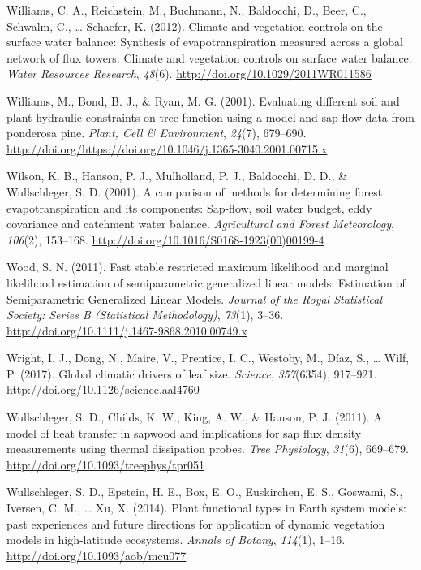 \documentclass[11pt,twoside]{reedthesis}
\begin{document}
\hypertarget{ref-williams_climate_2012}{}
Williams, C. A., Reichstein, M., Buchmann, N., Baldocchi, D., Beer, C.,
Schwalm, C., \ldots{} Schaefer, K. (2012). Climate and vegetation
controls on the surface water balance: Synthesis of evapotranspiration
measured across a global network of flux towers: Climate and vegetation
controls on surface water balance. \emph{Water Resources Research},
\emph{48}(6). \url{http://doi.org/10.1029/2011WR011586}

\hypertarget{ref-Williams2001}{}
Williams, M., Bond, B. J., \& Ryan, M. G. (2001). Evaluating different
soil and plant hydraulic constraints on tree function using a model and
sap flow data from ponderosa pine. \emph{Plant, Cell \& Environment},
\emph{24}(7), 679--690.
\url{http://doi.org/https://doi.org/10.1046/j.1365-3040.2001.00715.x}

\hypertarget{ref-Wilson2001}{}
Wilson, K. B., Hanson, P. J., Mulholland, P. J., Baldocchi, D. D., \&
Wullschleger, S. D. (2001). A comparison of methods for determining
forest evapotranspiration and its components: Sap-flow, soil water
budget, eddy covariance and catchment water balance. \emph{Agricultural
and Forest Meteorology}, \emph{106}(2), 153--168.
\url{http://doi.org/10.1016/S0168-1923(00)00199-4}

\hypertarget{ref-wood_fast_2011}{}
Wood, S. N. (2011). Fast stable restricted maximum likelihood and
marginal likelihood estimation of semiparametric generalized linear
models: Estimation of Semiparametric Generalized Linear Models.
\emph{Journal of the Royal Statistical Society: Series B (Statistical
Methodology)}, \emph{73}(1), 3--36.
\url{http://doi.org/10.1111/j.1467-9868.2010.00749.x}

\hypertarget{ref-wright_global_2017}{}
Wright, I. J., Dong, N., Maire, V., Prentice, I. C., Westoby, M., Díaz,
S., \ldots{} Wilf, P. (2017). Global climatic drivers of leaf size.
\emph{Science}, \emph{357}(6354), 917--921.
\url{http://doi.org/10.1126/science.aal4760}

\hypertarget{ref-Wullschleger2011}{}
Wullschleger, S. D., Childs, K. W., King, A. W., \& Hanson, P. J.
(2011). A model of heat transfer in sapwood and implications for sap
flux density measurements using thermal dissipation probes. \emph{Tree
Physiology}, \emph{31}(6), 669--679.
\url{http://doi.org/10.1093/treephys/tpr051}

\hypertarget{ref-Wullschleger2014}{}
Wullschleger, S. D., Epstein, H. E., Box, E. O., Euskirchen, E. S.,
Goswami, S., Iversen, C. M., \ldots{} Xu, X. (2014). Plant functional
types in Earth system models: past experiences and future directions for
application of dynamic vegetation models in high-latitude ecosystems.
\emph{Annals of Botany}, \emph{114}(1), 1--16.
\url{http://doi.org/10.1093/aob/mcu077}
\end{document}
